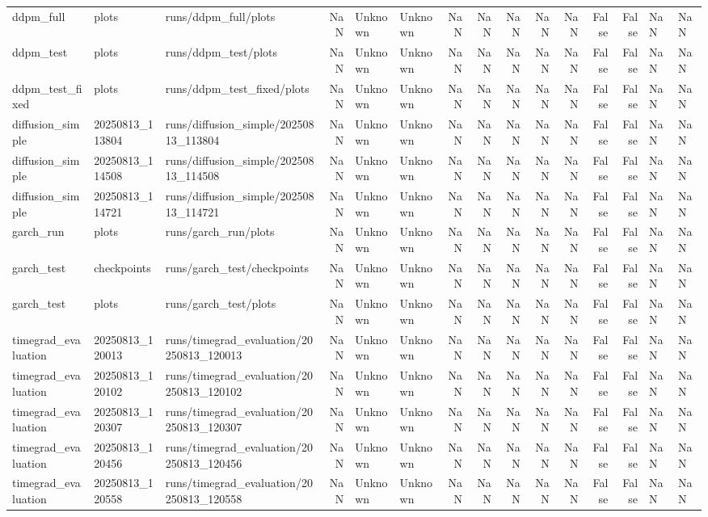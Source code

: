 \begin{tabular}{lllrllrrrrrrrll}
ddpm_full & plots & runs/ddpm_full/plots & NaN & Unknown & Unknown & NaN & NaN & NaN & NaN & NaN & False & False & NaN & NaN \\
ddpm_test & plots & runs/ddpm_test/plots & NaN & Unknown & Unknown & NaN & NaN & NaN & NaN & NaN & False & False & NaN & NaN \\
ddpm_test_fixed & plots & runs/ddpm_test_fixed/plots & NaN & Unknown & Unknown & NaN & NaN & NaN & NaN & NaN & False & False & NaN & NaN \\
diffusion_simple & 20250813_113804 & runs/diffusion_simple/20250813_113804 & NaN & Unknown & Unknown & NaN & NaN & NaN & NaN & NaN & False & False & NaN & NaN \\
diffusion_simple & 20250813_114508 & runs/diffusion_simple/20250813_114508 & NaN & Unknown & Unknown & NaN & NaN & NaN & NaN & NaN & False & False & NaN & NaN \\
diffusion_simple & 20250813_114721 & runs/diffusion_simple/20250813_114721 & NaN & Unknown & Unknown & NaN & NaN & NaN & NaN & NaN & False & False & NaN & NaN \\
garch_run & plots & runs/garch_run/plots & NaN & Unknown & Unknown & NaN & NaN & NaN & NaN & NaN & False & False & NaN & NaN \\
garch_test & checkpoints & runs/garch_test/checkpoints & NaN & Unknown & Unknown & NaN & NaN & NaN & NaN & NaN & False & False & NaN & NaN \\
garch_test & plots & runs/garch_test/plots & NaN & Unknown & Unknown & NaN & NaN & NaN & NaN & NaN & False & False & NaN & NaN \\
timegrad_evaluation & 20250813_120013 & runs/timegrad_evaluation/20250813_120013 & NaN & Unknown & Unknown & NaN & NaN & NaN & NaN & NaN & False & False & NaN & NaN \\
timegrad_evaluation & 20250813_120102 & runs/timegrad_evaluation/20250813_120102 & NaN & Unknown & Unknown & NaN & NaN & NaN & NaN & NaN & False & False & NaN & NaN \\
timegrad_evaluation & 20250813_120307 & runs/timegrad_evaluation/20250813_120307 & NaN & Unknown & Unknown & NaN & NaN & NaN & NaN & NaN & False & False & NaN & NaN \\
timegrad_evaluation & 20250813_120456 & runs/timegrad_evaluation/20250813_120456 & NaN & Unknown & Unknown & NaN & NaN & NaN & NaN & NaN & False & False & NaN & NaN \\
timegrad_evaluation & 20250813_120558 & runs/timegrad_evaluation/20250813_120558 & NaN & Unknown & Unknown & NaN & NaN & NaN & NaN & NaN & False & False & NaN & NaN \\

\end{tabular}
